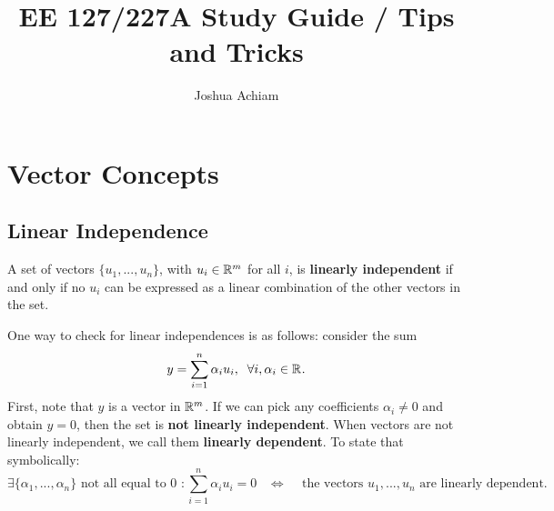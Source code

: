\documentclass[12pt]{article}
\title{EE 127/227A Study Guide / Tips and Tricks}
\author{Joshua Achiam}
\begin{document}


\newtheorem{example}{Example}
\theoremstyle{remark}
\newtheorem*{myremark}{Remark}
\newcommand{\Span}[1]{\text{span}(\{#1\})}

\maketitle


\section{Vector Concepts}

\subsection{Linear Independence}

A set of vectors $\{u_1, ..., u_n\}$, with $u_i \in { {\mathbb R}^{m} }$ for all $i$, is \textbf{linearly independent} if and only if no $u_i$ can be expressed as a linear combination of the other vectors in the set. 

One way to check for linear independences is as follows: consider the sum
%
\begin{equation*}
y = \sum_{i=1}^n \alpha_i u_i, \;\; \forall i, \alpha_i \in { {\mathbb R}^{} }.
\end{equation*}
%
First, note that $y$ is a vector in ${ {\mathbb R}^{m} }$. If we can pick any coefficients $\alpha_i \neq 0$ and obtain $y = 0$, then the set is \textbf{not linearly independent}. When vectors are not linearly independent, we call them \textbf{linearly dependent}. To state that symbolically:
%
\begin{equation*}
\exists \{\alpha_1, ..., \alpha_n\} \text{ not all equal to 0 } : \sum_{i=1}^n \alpha_i u_i = 0 \;\;\; \Longleftrightarrow \;\;\; \text{ the vectors } u_1, ..., u_n \text{ are linearly dependent.}
\end{equation*}
\end{document}
